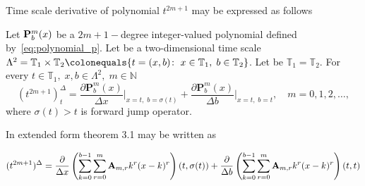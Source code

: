 Time scale derivative of polynomial $t^{2m+1}$ may be expressed as follows
\begin{thm}
    \label{main_theorem}
    Let ${\mathbf{P}}\sp{m} \sb{b}(x)$ be a $2m+1-$degree integer-valued polynomial defined by~\eqref{eq:polynomial_p}.
    Let be a two-dimensional time scale
    $\Lambda^2 = \mathbb{T}_1 \times \mathbb{T}_2 \colonequals \{t=(x, b) \colon \; x\in\mathbb{T}_1, \; b\in\mathbb{T}_2 \}$.
    Let be $\mathbb{T}_1 = \mathbb{T}_2$.
    For every $t\in\mathbb{T}_1, \; x,b\in \Lambda^2, \; m\in\mathbb{N}$
    \[
        (t^{2m+1})^{\Delta}_{t} =
        \frac{\partial \mathbf{P}_b^m(x)}{\Delta x} \bigg |_{x = t, \; b = \sigma(t)}+
        \frac{\partial \mathbf{P}_b^m(x)}{\Delta b}\bigg |_{x = t, \; b = t}, \quad m = 0,1,2,\dots,
    \]
    where $\sigma(t) > t$ is forward jump operator.
\end{thm}

In extended form theorem 3.1 may be written as

\begin{align*}
    (t^{2m+1})^{\Delta} = \frac{\partial}{\Delta x} \left( \sum_{k=0}^{b-1} \sum_{r=0}^{m} {\mathbf{A}} \sb{m,r} k^r(x-k)^r \right) (t, \sigma(t))
    + \frac{\partial}{\Delta b} \left( \sum_{k=0}^{b-1} \sum_{r=0}^{m} {\mathbf{A}} \sb{m,r} k^r(x-k)^r \right) (t, t)
\end{align*}